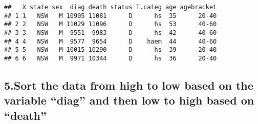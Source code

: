 \documentclass[
]{article}
\newenvironment{Shaded}{\begin{snugshade}}{\end{snugshade}}
\newcommand{\KeywordTok}[1]{\textcolor[rgb]{0.13,0.29,0.53}{\textbf{#1}}}
\newcommand{\NormalTok}[1]{#1}
\newcommand{\OperatorTok}[1]{\textcolor[rgb]{0.81,0.36,0.00}{\textbf{#1}}}
\newcommand{\StringTok}[1]{\textcolor[rgb]{0.31,0.60,0.02}{#1}}
\begin{document}
\begin{Shaded}
\end{Shaded}

\begin{verbatim}
##   X state sex  diag death status T.categ age agebracket
## 1 1   NSW   M 10905 11081      D      hs  35      20-40
## 2 2   NSW   M 11029 11096      D      hs  53      40-60
## 3 3   NSW   M  9551  9983      D      hs  42      40-60
## 4 4   NSW   M  9577  9654      D    haem  44      40-60
## 5 5   NSW   M 10015 10290      D      hs  39      20-40
## 6 6   NSW   M  9971 10344      D      hs  36      20-40
\end{verbatim}

\hypertarget{sort-the-data-from-high-to-low-based-on-the-variable-diag-and-then-low-to-high-based-on-death}{%
\subsection{5.Sort the data from high to low based on the variable
``diag'' and then low to high based on
``death''}\label{sort-the-data-from-high-to-low-based-on-the-variable-diag-and-then-low-to-high-based-on-death}}
\end{document}
